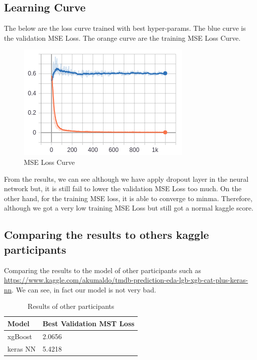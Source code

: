 \documentclass{article}
\begin{document}
\subsection{Learning Curve}
The below are the loss curve trained with best hyper-params. The blue curve is the validation MSE Loss. The orange curve are the training MSE Loss Curve.

\begin{figure}[h]
  \centering
  \includegraphics[scale=1]{learning_curve.png}
  \caption{MSE Loss Curve}
\end{figure}

From the results, we can see although we have apply dropout layer in the neural network but, it is still fail to lower the validation MSE Loss too much. On the other hand, for the training MSE loss, it is able to converge to minma. Therefore, although we got a very low training MSE Loss but still got a normal kaggle score.

\pagebreak

\subsection{Comparing the results to others kaggle participants}

Comparing the results to the model of other participants such as \url{https://www.kaggle.com/akumaldo/tmdb-prediction-eda-lgb-xgb-cat-plus-keras-nn}. We can see, in fact our model is not very bad. 

\begin{table}[htb]
	\caption{Results of other participants}
	\label{sample-table}
	\centering
	\begin{tabular}{ll}
		\toprule
		\cmidrule{1-2}
		Model & Best Validation MST Loss\\
		\midrule
		xgBoost & 2.0656   \\
		keras NN & 5.4218   \\
		\bottomrule
	\end{tabular}
\end{table}
\end{document}

